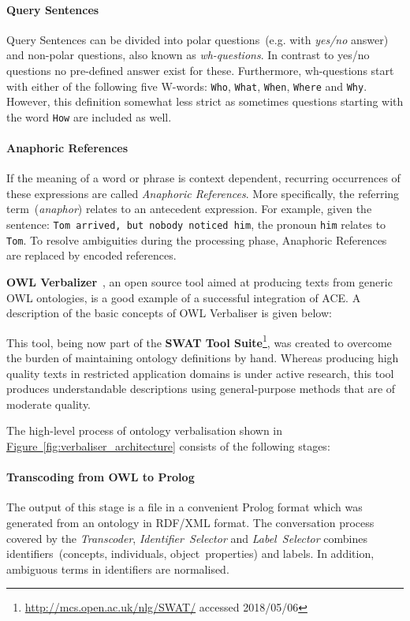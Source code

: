 \documentclass[draft,final]{vutinfth} %
\begin{document}
\paragraph{Query Sentences} Query Sentences can be divided into polar questions~(e.g. with \textit{yes/no} answer) and non-polar questions, also known as \emph{wh-questions}. In contrast to yes/no questions no pre-defined answer exist for these. Furthermore, wh-questions start with either of the following five W-words: \texttt{Who}, \texttt{What}, \texttt{When}, \texttt{Where} and \texttt{Why}. However, this definition somewhat less strict as sometimes questions starting with the word \texttt{How} are included as well.

\paragraph{Anaphoric References} If the meaning of a word or phrase is context dependent, recurring occurrences of these expressions are called \textit{Anaphoric References}. More specifically, the referring term~(\textit{anaphor}) relates to an antecedent expression. For example, given the sentence: \texttt{Tom arrived, but nobody noticed him}, the pronoun \texttt{him} relates to \texttt{Tom}. To resolve ambiguities during the processing phase, Anaphoric References are replaced by encoded references. 

\textbf{OWL Verbalizer}~\cite{stevens2011}, an open source tool aimed at producing texts from generic OWL ontologies, is a good example of a successful integration of ACE. A description of the basic concepts of OWL Verbaliser is given below:

This tool, being now part of the \textbf{SWAT Tool Suite}\footnote{\url{http://mcs.open.ac.uk/nlg/SWAT/} accessed 2018/05/06}, was created to overcome the burden of maintaining ontology definitions by hand. Whereas producing high quality texts in restricted application domains is under active research, this tool produces understandable descriptions using general-purpose methods that are of moderate quality.

The high-level process of ontology verbalisation shown in \hyperref[fig:verbaliser_architecture]{Figure~\ref*{fig:verbaliser_architecture}} consists of the following stages:

\paragraph{Transcoding from OWL to Prolog} The output of this stage is a file in a convenient Prolog format which was generated from an ontology in RDF/XML format. The conversation process covered by the \textit{Transcoder}, \textit{Identifier~Selector} and \textit{Label~Selector} combines identifiers~(concepts, individuals, object~properties) and labels. In addition, ambiguous terms in identifiers are normalised. 
\end{document}
